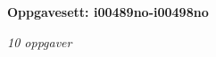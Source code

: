 \centerline{\bf Oppgavesett: i00489no-i00498no}
\vskip 10pt
\centerline{\it 10 oppgaver}\vskip 10pt
\vskip 10pt
